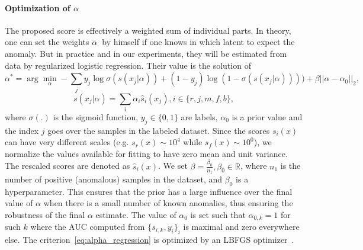 \paragraph{Optimization of $\alpha$ } The proposed score is effectively a weighted sum of individual parts. In theory, one can set the weights $\alpha_\cdot$ by himself if one knows in which latent to expect the anomaly. But in practice and in our experiments, they will be estimated from data by regularized logistic regression. Their value is the solution of
\begin{equation} \label{eq:alpha_regression}
    \alpha^* = \arg \min_{\alpha} - \sum_j y_j \log \sigma (s(x_j\vert\alpha)) + (1-y_j) \log(1-\sigma (s(x_j\vert\alpha)))) + \beta \vert \vert \alpha - \alpha_0 \vert \vert_2 ,
\end{equation}
\begin{equation}
    s(x_j\vert\alpha) = \sum_i \alpha_i \hat{s}_i(x_j), i \in \lbrace r, j, m, f, b \rbrace,
\end{equation}
where $\sigma(.)$ is the sigmoid function, $y_j \in \lbrace 0,1 \rbrace$ are labels, $\alpha_0$ is a prior value and the index $j$ goes over the samples in the labeled dataset. Since the scores $s_i(x)$ can have very different scales (e.g. $s_r(x) \sim 10^4$ while $s_f(x) \sim 10^0$), we normalize the values available for fitting to have zero mean and unit variance. The rescaled scores are denoted as $\hat{s}_i(x)$. We set $\beta = \frac{\beta_0}{n_1}, \beta_0 \in \mathbb{R}$, where $n_1$ is the number of positive (anomalous) samples in the dataset, and $\beta_0$ is a hyperparameter. This ensures that the prior has a large influence over the final value of $\alpha$ when there is a small number of known anomalies, thus ensuring the robustness of the final $\alpha$ estimate. The value of $\alpha_0$ is set such that $\alpha_{0,k}=1$ for such $k$ where the AUC computed from $\lbrace s_{i,k}, y_i \rbrace_i$ is maximal and zero everywhere else. The criterion~\eqref{eq:alpha_regression} is optimized by an LBFGS optimizer~\cite{liu1989limited}.

